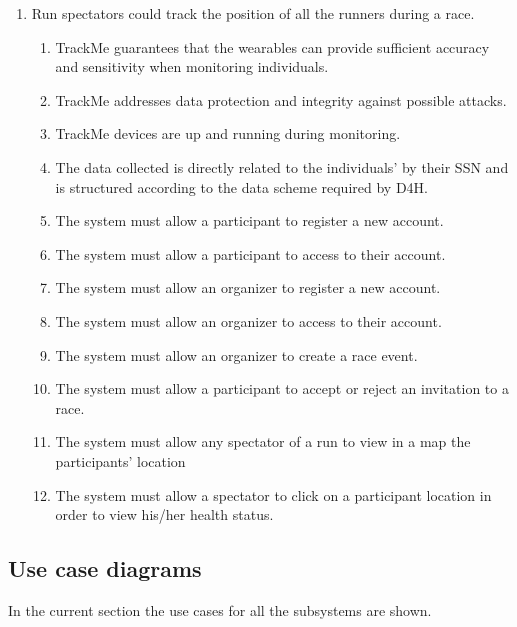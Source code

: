 \documentclass[a4paper, hidelinks, 12pt]{report}
\newcommand\requirement[1]{\item[{[R#1]}] }
\newcommand\goal[1]{\item[{[G#1]}] }
\newcommand\assumption[1]{\item[{[D#1]}] }
\begin{document}
\begin{enumerate}
		\goal{7} Run spectators could track the position of all the runners during a race.
		\begin{enumerate}
			\assumption{1} TrackMe guarantees that the wearables can provide sufficient accuracy and sensitivity when monitoring individuals.
			\assumption{2} TrackMe addresses data protection and integrity against possible attacks.
			\assumption{3} TrackMe devices are up and running during monitoring.
			\assumption{4} The data collected is directly related to the individuals' by their SSN and is structured according to the data scheme required by D4H.
			\requirement{16} The system must allow a participant to register a new account.
			\requirement{17} The system must allow a participant to access to their account.
			\requirement{18} The system must allow an organizer to register a new account.
			\requirement{19} The system must allow an organizer to access to their account.
			\requirement{20} The system must allow an organizer to create a race event.
			\requirement{23} The system must allow a participant to accept or reject an invitation to a race.
			\requirement{24} The system must allow any spectator of a run to view in a map the participants' location
			\requirement{25} The system must allow a spectator to click on a participant location in order to view his/her health status.
		\end{enumerate}
		
	\end{enumerate}
	
	\subsection{Use case diagrams}
	In the current section the use cases for all the subsystems are shown.
	
\end{document}
